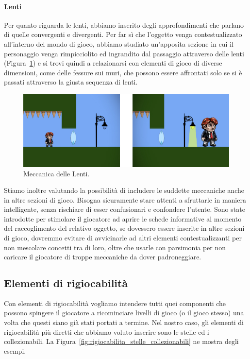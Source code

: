 \paragraph{Lenti}
\label{par_meccanica_lenti}
Per quanto riguarda le lenti, abbiamo inserito degli approfondimenti che parlano di quelle convergenti e divergenti.
Per far sì che l’oggetto venga contestualizzato all’interno del mondo di gioco, abbiamo studiato un’apposita sezione in cui il personaggio venga rimpicciolito ed ingrandito dal passaggio attraverso delle lenti (Figura~\ref{fig:meccaniche_precinema_lenti}) e si trovi quindi a relazionarsi con elementi di gioco di diverse dimensioni, come delle fessure sui muri, che possono essere affrontati solo se si è passati attraverso la giusta sequenza di lenti.

\begin{figure}%
	\centering
	\includegraphics[width= 0.9\columnwidth]{images/gameDesign/24_lenti.jpg}
	\caption{Meccanica delle Lenti.}
	\label{fig:meccaniche_precinema_lenti}
\end{figure} 

Stiamo inoltre valutando la possibilità di includere le suddette meccaniche anche in altre sezioni di gioco. Bisogna sicuramente stare attenti a sfruttarle in maniera intelligente, senza rischiare di esser confusionari e confondere l’utente. Sono state introdotte per stimolare il giocatore ad aprire le schede informative al momento del raccoglimento del relativo oggetto, se dovessero essere inserite in altre sezioni di gioco, dovremmo evitare di avvicinarle ad altri elementi contestualizzanti per non mescolare concetti tra di loro, oltre che usarle con parsimonia per non caricare il giocatore di troppe meccaniche da dover padroneggiare.

\subsection{Elementi di rigiocabilità}
\label{sec:elementi_rigiocabilita}

Con elementi di rigiocabilità vogliamo intendere tutti quei componenti che possono spingere il giocatore a ricominciare livelli di gioco (o il gioco stesso) una volta che questi siano già stati portati a termine.
Nel nostro caso, gli elementi di rigiocabilità più diretti che abbiamo voluto inserire sono le stelle ed i collezionabili. La Figura~\ref{fig:rigiocabilita_stelle_collezionabili} ne mostra degli esempi.

